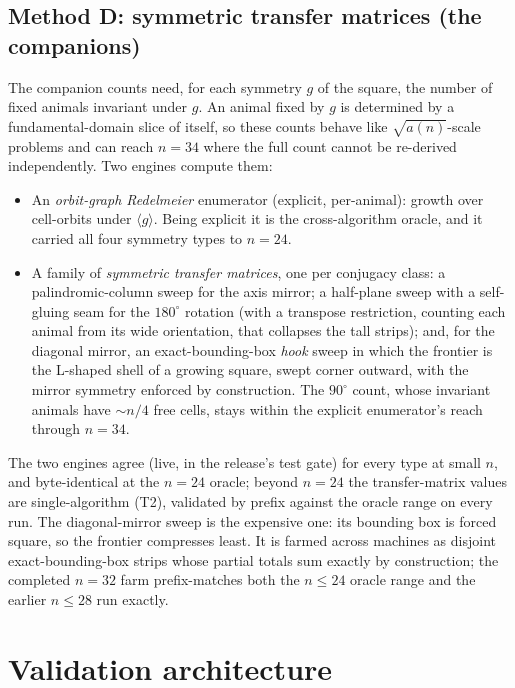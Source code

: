 \documentclass[11pt]{article}
\newcommand{\tiertwo}{\textsf{T2}}
\begin{document}
\subsection{Method D: symmetric transfer matrices (the companions)}
\label{sec:methodD}

The companion counts need, for each symmetry $g$ of the square, the number of
fixed animals invariant under $g$. An animal fixed by $g$ is determined by a
fundamental-domain slice of itself, so these counts behave like
$\sqrt{a(n)}$-scale problems and can reach $n=34$ where the full count cannot
be re-derived independently. Two engines compute them:

\begin{itemize}
  \item An \emph{orbit-graph Redelmeier} enumerator (explicit, per-animal):
        growth over cell-orbits under $\langle g\rangle$. Being explicit it is
        the cross-algorithm oracle, and it carried all four symmetry types to
        $n=24$.
  \item A family of \emph{symmetric transfer matrices}, one per conjugacy
        class: a palindromic-column sweep for the axis mirror; a half-plane
        sweep with a self-gluing seam for the $180^\circ$ rotation (with a
        transpose restriction, counting each animal from its wide
        orientation, that collapses the tall strips); and, for the diagonal
        mirror, an exact-bounding-box \emph{hook} sweep in which the frontier is the
        L-shaped shell of a growing square, swept corner outward, with the
        mirror symmetry enforced by construction. The $90^\circ$ count, whose
        invariant animals have $\sim n/4$ free cells, stays within the
        explicit enumerator's reach through $n=34$.
\end{itemize}

The two engines agree (live, in the release's test gate) for every type at
small $n$, and byte-identical at the $n=24$ oracle; beyond $n=24$ the
transfer-matrix values are single-algorithm (\tiertwo{}), validated by prefix
against the oracle range on every run. The diagonal-mirror sweep is the
expensive one: its bounding box is forced square, so the frontier
compresses least. It is farmed across machines as disjoint
exact-bounding-box strips whose partial totals sum exactly by construction;
the completed $n=32$ farm prefix-matches both the $n\le24$ oracle range and
the earlier $n\le28$ run exactly.

\section{Validation architecture}
\label{sec:confirm}
\end{document}
